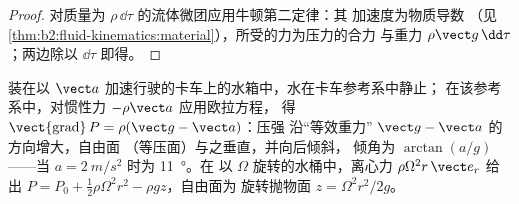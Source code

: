 \begin{proof}
对质量为 $\rho\,\dd\tau$ 的流体微团应用牛顿第二定律：其
加速度为物质导数
（见\cref{thm:b2:fluid-kinematics:material}），所受的力为压力的合力
与重力 $\rho\vect g\,\dd\tau$；两边除以 $\dd\tau$ 即得。
\end{proof}

\begin{example}[加速运动的水箱]\label{ex:b2:euler-bernoulli:tank}
装在以 $\vect a$ 加速行驶的卡车上的水箱中，水在卡车参考系中静止；
在该参考系中，对惯性力 $-\rho\vect a$ 应用欧拉方程，
得 $\operatorname{\vect{grad}}P = \rho(\vect g - \vect a)$：压强
沿“等效重力” $\vect g - \vect a$ 的方向增大，自由面
（等压面）与之垂直，并向后倾斜，
倾角为 $\arctan(a/g)$——当 $a = \qty{2}{m/s^2}$ 时为 \qty{11}{\degree}。在
以 $\Omega$ 旋转的水桶中，离心力 $\rho\Omega^2r\,\vect e_r$
给出 $P = P_0 + \tfrac12\rho\Omega^2r^2 - \rho gz$，自由面为
旋转抛物面 $z = \Omega^2r^2/2g$。
\end{example}

